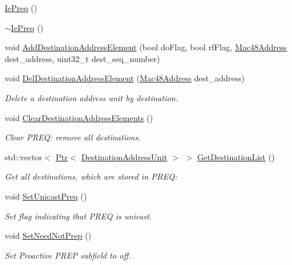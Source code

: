 \begin{DoxyCompactItemize}
\item 
\hyperlink{classns3_1_1dot11s_1_1IePreq_a60fe4082b18b14970286bd015c789d2b}{Ie\+Preq} ()
\item 
\hyperlink{classns3_1_1dot11s_1_1IePreq_a535c176a1d8d1438f5b88528f278abac}{$\sim$\+Ie\+Preq} ()
\item 
void \hyperlink{classns3_1_1dot11s_1_1IePreq_af0d2802f8e3a2e6526a973e27500e21d}{Add\+Destination\+Address\+Element} (bool do\+Flag, bool rf\+Flag, \hyperlink{classns3_1_1Mac48Address}{Mac48\+Address} dest\+\_\+address, uint32\+\_\+t dest\+\_\+seq\+\_\+number)
\item 
void \hyperlink{classns3_1_1dot11s_1_1IePreq_a07b633e73b34a092f4a74a275173187e}{Del\+Destination\+Address\+Element} (\hyperlink{classns3_1_1Mac48Address}{Mac48\+Address} dest\+\_\+address)
\begin{DoxyCompactList}\small\item\em Delete a destination address unit by destination. \end{DoxyCompactList}\item 
void \hyperlink{classns3_1_1dot11s_1_1IePreq_a94b8ac2b07c37cc829b3b48c78b344cc}{Clear\+Destination\+Address\+Elements} ()
\begin{DoxyCompactList}\small\item\em Clear P\+R\+EQ\+: remove all destinations. \end{DoxyCompactList}\item 
std\+::vector$<$ \hyperlink{classns3_1_1Ptr}{Ptr}$<$ \hyperlink{classns3_1_1dot11s_1_1DestinationAddressUnit}{Destination\+Address\+Unit} $>$ $>$ \hyperlink{classns3_1_1dot11s_1_1IePreq_a58f474f2512ee9e16ddc901fdc061640}{Get\+Destination\+List} ()
\begin{DoxyCompactList}\small\item\em Get all destinations, which are stored in P\+R\+EQ\+: \end{DoxyCompactList}\item 
void \hyperlink{classns3_1_1dot11s_1_1IePreq_a3fe56e86ead1bc1b4ac4c8f09f0a0f73}{Set\+Unicast\+Preq} ()
\begin{DoxyCompactList}\small\item\em Set flag indicating that P\+R\+EQ is unicast. \end{DoxyCompactList}\item 
void \hyperlink{classns3_1_1dot11s_1_1IePreq_a2477cfc96021170edadfdeefd5df63ab}{Set\+Need\+Not\+Prep} ()
\begin{DoxyCompactList}\small\item\em Set Proactive P\+R\+EP subfield to off. \end{DoxyCompactList}\item 

\end{DoxyCompactItemize}
